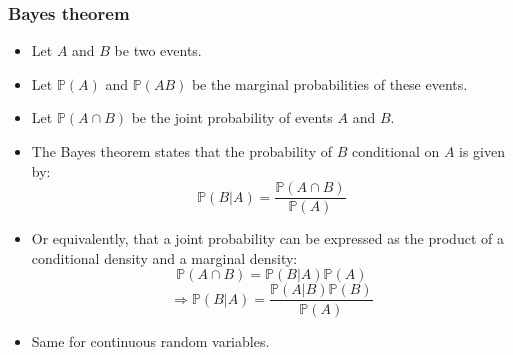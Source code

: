 \documentclass[10pt,slidestop]{beamer}
\begin{document}
\begin{frame}
  \frametitle{Bayes theorem}

  \begin{itemize}

  \item Let $A$ and $B$ be two events.

    \bigskip

  \item Let $\mathbb P(A)$ and  $\mathbb P(AB)$ be the marginal
    probabilities of these events.

    \bigskip

  \item Let $\mathbb P(A \cap B)$ be the joint probability of events $A$
    and $B$.

    \bigskip

  \item The Bayes theorem states that the probability of $B$
    conditional on $A$ is given by:
    \[
    \mathbb P(B|A) = \frac{\mathbb P(A \cap B)}{\mathbb P(A)}
    \]

    \bigskip

  \item Or equivalently, that a joint probability can be expressed as
    the product of a conditional density and a marginal density:
    \[
    \mathbb P(A \cap B) = \mathbb P(B|A)\mathbb P(A)
    \]
    \[
    \Rightarrow \mathbb P(B|A) = \frac{\mathbb P(A|B)\mathbb P(B)}{\mathbb P(A)}
    \]

    \bigskip

  \item Same for continuous random variables.

  \end{itemize}

   \end{frame}
\end{document}
